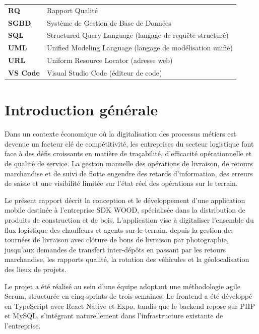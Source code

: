 \documentclass[12pt,a4paper]{article}
\begin{document}
\begin{longtable}{p{2.5cm} p{12cm}}
    \textbf{RQ} & Rapport Qualité \\
    \textbf{SGBD} & Système de Gestion de Base de Données \\
    \textbf{SQL} & Structured Query Language (langage de requête structuré) \\
    \textbf{UML} & Unified Modeling Language (langage de modélisation unifié) \\
    \textbf{URL} & Uniform Resource Locator (adresse web) \\
    \textbf{VS Code} & Visual Studio Code (éditeur de code) \\
    \end{longtable}
   
    \newpage


    \section*{Introduction générale}

    Dans un contexte économique où la digitalisation des processus métiers est devenue un facteur clé de compétitivité, les entreprises du secteur logistique font face à des défis croissants en matière de traçabilité, d'efficacité opérationnelle et de qualité de service. La gestion manuelle des opérations de livraison, de retours marchandise et de suivi de flotte engendre des retards d'information, des erreurs de saisie et une visibilité limitée sur l'état réel des opérations sur le terrain.

    Le présent rapport décrit la conception et le développement d'une application mobile destinée à l'entreprise SDK WOOD, spécialisée dans la distribution de produits de construction et de bois. L'application vise à digitaliser l'ensemble du flux logistique des chauffeurs et agents sur le terrain, depuis la gestion des tournées de livraison avec clôture de bons de livraison par photographie, jusqu'aux demandes de transfert inter-dépôts en passant par les retours marchandise, les rapports qualité, la rotation des véhicules et la géolocalisation des lieux de projets.

    Le projet a été réalisé au sein d'une équipe adoptant une méthodologie agile Scrum, structurée en cinq sprints de trois semaines. Le frontend a été développé en TypeScript avec React Native et Expo, tandis que le backend repose sur PHP et MySQL, s'intégrant naturellement dans l'infrastructure existante de l'entreprise.
\end{document}
